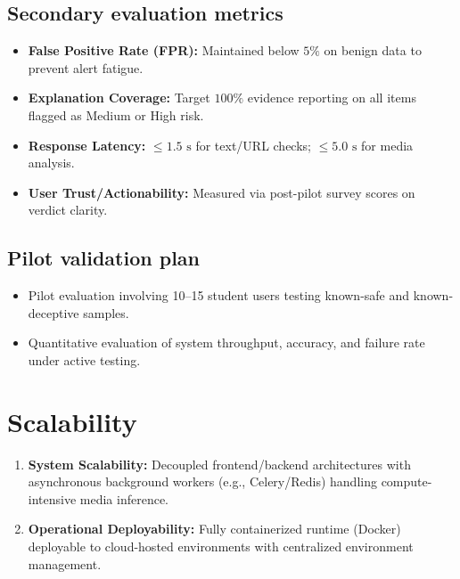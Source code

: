 \documentclass[11pt,a4paper]{article}
\newcommand{\BvrHint}[1]{%
  {\normalfont\normalsize\itshape\hfill #1}}
\begin{document}
\subsection{Secondary evaluation metrics}
\begin{itemize}[leftmargin=0.7cm]
    \item \textbf{False Positive Rate (FPR):} Maintained below $5\%$ on benign data to prevent alert fatigue.
    \item \textbf{Explanation Coverage:} Target $100\%$ evidence reporting on all items flagged as Medium or High risk.
    \item \textbf{Response Latency:} $\leq 1.5\text{ s}$ for text/URL checks; $\leq 5.0\text{ s}$ for media analysis.
    \item \textbf{User Trust/Actionability:} Measured via post-pilot survey scores on verdict clarity.
\end{itemize}

\subsection{Pilot validation plan %
\BvrHint{}}
\begin{itemize}[leftmargin=0.7cm]
    \item Pilot evaluation involving 10--15 student users testing known-safe and known-deceptive samples.
    \item Quantitative evaluation of system throughput, accuracy, and failure rate under active testing.
\end{itemize}

\section{Scalability %
\BvrHint{}}
\begin{enumerate}[leftmargin=0.7cm]
    \item \textbf{System Scalability:} Decoupled frontend/backend architectures with asynchronous background workers (e.g., Celery/Redis) handling compute-intensive media inference.
    \item \textbf{Operational Deployability:} Fully containerized runtime (Docker) deployable to cloud-hosted environments with centralized environment management.
\end{enumerate}
\end{document}
